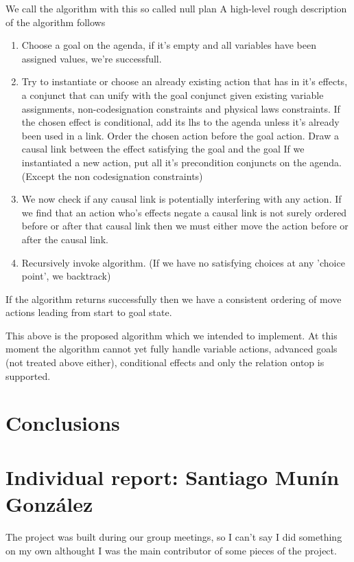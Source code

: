 \documentclass[11pt]{article}
\begin{document}
We call the algorithm with this so called null plan
A high-level rough description of the algorithm follows
\begin{enumerate}
\item 
  Choose a goal on the agenda, if it's empty and all variables have been
  assigned values, we're successfull.
\item 
  Try to instantiate or choose an already existing action that has in it's
  effects, a conjunct that can unify with the goal conjunct given existing
  variable assignments, non-codesignation constraints and physical laws
  constraints.  If the chosen effect is conditional, add its lhs to the agenda
  unless it's already been used in a link.  Order the chosen action before the
  goal action.  Draw a causal link between the effect satisfying the goal and
  the goal If we instantiated a new action, put all it's precondition conjuncts
  on the agenda.  (Except the non codesignation constraints)  
\item
  We now check if any causal link is potentially interfering with any action.
  If we find that an action who's effects negate a causal link is not surely
  ordered before or after that causal link then we must either move the action
  before or after the causal link. 
\item
  Recursively invoke algorithm. (If we have no satisfying choices at any 
  'choice point', we backtrack)
\end{enumerate}

If the algorithm returns successfully then we have a consistent ordering of move
actions leading from start to goal state.

This above is the proposed algorithm which we intended to implement.  At this
moment the algorithm cannot yet fully handle variable actions, advanced goals
(not treated above either), conditional effects and only the relation ontop is
supported. 
    
\section{Conclusions}

\newpage
\appendix
\section{Individual report: Santiago Munín González}
The project was built during our group meetings, so I can't say I did something on my own althought I 
was the main contributor of some pieces of the project.
\end{document}
